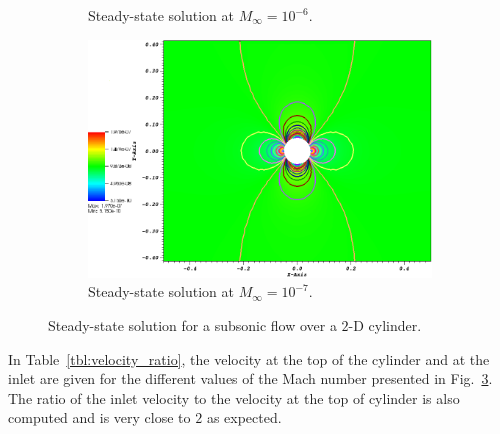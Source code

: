 \documentclass[preprint,10pt]{elsarticle}
\newcommand{\fig}[1]{Fig.~\ref{#1}}                      %
\newcommand{\tbl}[1]{Table~\ref{#1}}                     %
\begin{document}
\begin{figure}[H]
\begin{subfigure}[b]{0.495\textwidth}
                \caption{Steady-state solution at $M_{\infty}=10^{-6}$.}
                \label{fig:cyl_1em6}
        \end{subfigure}
        \begin{subfigure}[b]{0.495\textwidth}
                \centering
                \includegraphics[width=\textwidth]{CylinderMach1em7ZoomIn.png}
                \caption{Steady-state solution at $M_{\infty}=10^{-7}$.}
                \label{fig:cyl_1em7}
        \end{subfigure}
        \caption{Steady-state solution for a subsonic flow over a $2$-D cylinder.}\label{fig:cylinder}
\end{figure}
In \tbl{tbl:velocity_ratio}, the velocity at the top of the cylinder and at the inlet are given for the different values of the Mach number presented in \fig{fig:cylinder}. The ratio of the inlet velocity to the velocity at the top of cylinder is also computed and is very close to $2$ as expected.
\end{document}
